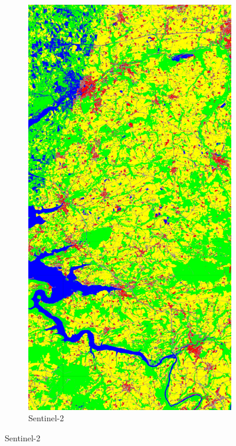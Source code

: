 \documentclass[10pt]{article}
\begin{document}
\begin{figure}[H]
    \centering 
    \begin{subfigure}{0.49\textwidth}
        \centering
        \includegraphics[width=\textwidth]{all_classif_S2}
        \caption{Sentinel-2}

\end{subfigure}
\end{figure}
\end{document}
